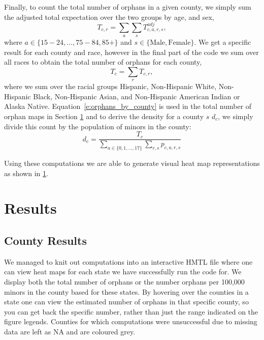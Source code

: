\documentclass[11pt]{article}
\begin{document}
Finally, to count the total number of orphans in a given county, we simply sum the adjusted total expectation over the two groups by age, and sex,
\begin{equation}
    T_{c,r} = \sum_a  \sum_s T^{adj}_{c,a,r,s},
\end{equation}
where $a \in \{15 - 24, \dots, 75-84, 85+\}$ and $s \in \{\textrm{Male}, \textrm{Female}\}$.
We get a specific result for each county and race, however in the final part of the code we sum over all races to obtain the total number of orphans for each county,
\begin{equation}\label{e:orphans_by_county}
    T_c = \sum_r T_{c,r},
\end{equation}
where we sum over the racial groups Hispanic, Non-Hispanic White, Non-Hispanic Black, Non-Hispanic Asian, and Non-Hispanic American Indian or Alaska Native. Equation~\eqref{e:orphans_by_county} is used in the total number of orphan maps in Section \ref{s:results} and to derive the density for a county $s$ $d_{c}$, we simply divide this count by the population of minors in the county:
\begin{equation}
    d_{c} = \frac{T_{c}}{\sum_{a\in\{0, 1, ..., 17\}}\sum_{r, s} p_{c, a, r, s}}
\end{equation}

Using these computations we are able to generate visual heat map representations as shown in \ref{s:results}.



\section{Results}\label{s:results}
\subsection{County Results}
We managed to knit out computations into an interactive HMTL file where one can view heat maps for each state we have successfully run the code for. We display both the total number of orphans or the number orphans per 100,000 minors in the county based for these states. By hovering over the counties in a state one can view the estimated number of orphans in that specific county, so you can get back the specific number, rather than just the range indicated on the figure legends. Counties for which computations were unsuccessful due to missing data are left as NA and are coloured grey.
\end{document}
